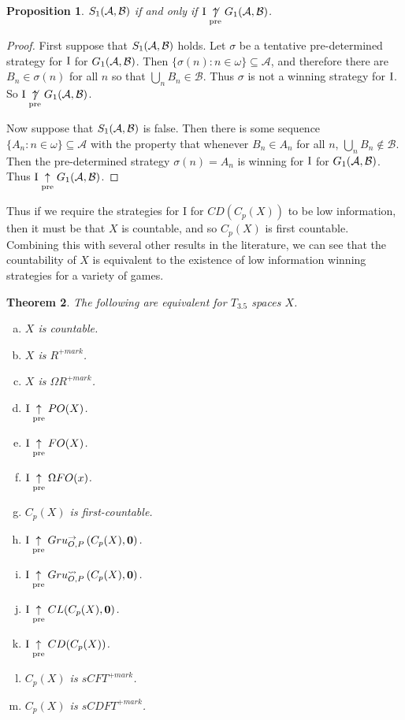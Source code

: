 \documentclass{amsart}
\theoremstyle{plain}
\newtheorem{theorem}{Theorem}
\newtheorem{proposition}[theorem]{Proposition}
\theoremstyle{definition}
\theoremstyle{remark}
\theoremstyle{plain}
\theoremstyle{definition}
\theoremstyle{remark}
\begin{document}
\begin{proposition}
\(S_{1}(\mathcal{A},\mathcal{B})\) if and only if \(\mathrm{I} \underset{\text{pre}}{\not\uparrow}G_{1}(\mathcal{A},\mathcal{B})\).
\end{proposition}
\begin{proof}
 First suppose that \(S_{1}(\mathcal{A},\mathcal{B})\) holds.
 Let \(\sigma\) be a tentative pre-determined strategy for \(\mathrm{I}\) for \(G_{1}(\mathcal{A},\mathcal{B})\).
 Then \(\{\sigma(n) : n \in \omega\} \subseteq \mathcal{A}\), and therefore there are \(B_n \in \sigma(n)\) for all \(n\) so that \(\bigcup_n B_n \in \mathcal{B}\).
 Thus \(\sigma\) is not a winning strategy for \(\mathrm{I}\).
 So \(\mathrm{I} \underset{\text{pre}}{\not\uparrow}G_{1}(\mathcal{A},\mathcal{B})\).
 
 Now suppose that \(S_{1}(\mathcal{A},\mathcal{B})\) is false.
 Then there is some sequence \(\{A_n : n \in \omega\} \subseteq \mathcal{A}\) with the property that whenever \(B_n \in A_n\) for all \(n\), \(\bigcup_n B_n \notin \mathcal{B}\).
 Then the pre-determined strategy \(\sigma(n) = A_n\) is winning for \(\mathrm{I}\) for \(G_{1}(\mathcal{A},\mathcal{B})\).
 Thus \(\mathrm{I} \underset{\text{pre}}{\uparrow}G_{1}(\mathcal{A},\mathcal{B})\).
\end{proof}

Thus if we require the strategies for I for \(CD(C_p(X))\) to be low information, then it must be that \(X\) is countable, and so \(C_p(X)\) is first countable.
Combining this with several other results in the literature, we can see that the countability of \(X\) is equivalent to the existence of low information winning strategies for a variety of games.

\begin{theorem}
The following are equivalent for \(T_{3.5}\) spaces \(X\).
 \begin{enumerate}[a)]
  \item \(X\) is countable.
  \item \(X\) is \(R^{+mark}\).
  \item \(X\) is \(\Omega R^{+mark}\).
  \item \(\mathrm{I}\underset{\text{pre}}{\uparrow} PO(X)\). 
  \item \(\mathrm{I}\underset{\text{pre}}{\uparrow} FO(X)\).
  \item \(\mathrm{I}\underset{\text{pre}}{\uparrow}\Omega FO(x)\).
  \item \(C_p(X)\) is first-countable.
  \item \(\mathrm{I}\underset{\text{pre}}{\uparrow} Gru_{O,P}^{\to}\left({C_p(X)},{\mathbf 0}\right)\).
  \item \(\mathrm{I}\underset{\text{pre}}{\uparrow} Gru_{O,P}^{\leadsto}\left({C_p(X)},{\mathbf 0}\right)\).
  \item \(\mathrm{I}\underset{\text{pre}}{\uparrow} CL(C_p(X),\mathbf 0)\).
  \item \(\mathrm{I}\underset{\text{pre}}{\uparrow} CD(C_p(X))\).
  \item \(C_p(X)\) is \(sCFT^{+mark}\).
  \item \(C_p(X)\) is \(sCDFT^{+mark}\).
 \end{enumerate}
\end{theorem}
\end{document}
